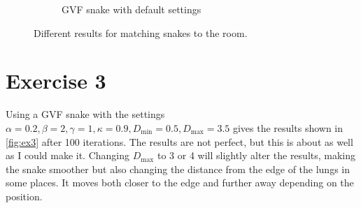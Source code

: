 \documentclass[a4paper]{article}
\begin{document}
\begin{figure}
\begin{subfigure}[t]{.3\textwidth}
		\caption{GVF snake with default settings}
	\end{subfigure}
	\caption{Different results for matching snakes to the room.}
	\label{fig:ex2}
\end{figure}

\section*{Exercise 3}
Using a GVF snake with the settings $\alpha=0.2, \beta=2, \gamma=1, \kappa=0.9, D_\text{min}=0.5, D_\text{max}=3.5$ gives the results shown in \autoref{fig:ex3} after 100 iterations. The results are not perfect, but this is about as well as I could make it. Changing $D_\text{max}$ to 3 or 4 will slightly alter the results, making the snake smoother but also changing the distance from the edge of the lungs in some places. It moves both closer to the edge and further away depending on the position.
\end{document}
